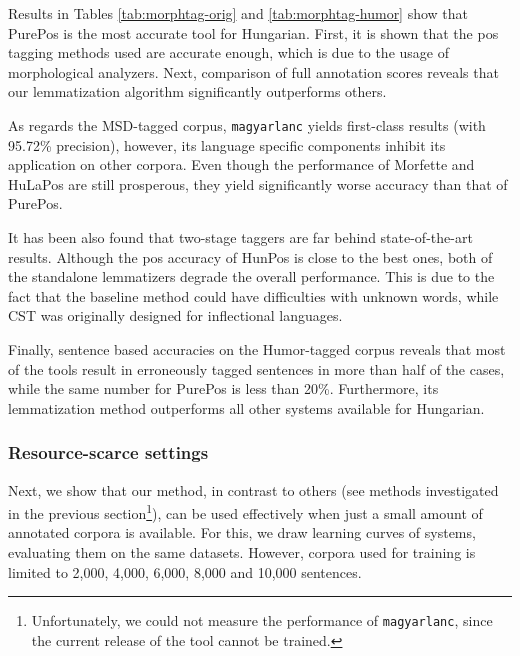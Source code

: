Results in Tables \ref{tab:morphtag-orig} and \ref{tab:morphtag-humor} show that PurePos is the most accurate tool for Hungarian. 
First, it is shown that the \gls{pos} tagging methods used are accurate enough, which is due to the usage of morphological analyzers. 
Next, comparison of full annotation scores reveals that our lemmatization algorithm significantly outperforms others. 

As regards the MSD-tagged corpus, \texttt{magyarlanc} yields first-class results (with 95.72\% precision), however, its language specific components inhibit its application on other corpora. 
Even though the performance of Morfette and HuLaPos are still prosperous, they yield significantly worse accuracy than that of PurePos.  

It has been also found that two-stage taggers are far behind state-of-the-art results. 
Although the \gls{pos} accuracy of HunPos is close to the best ones, both of the standalone lemmatizers degrade the overall performance. 
This is due to the fact that the baseline method could have difficulties with unknown words, while CST was originally designed for inflectional languages. 

Finally, sentence based accuracies on the Humor-tagged corpus reveals that most of the tools result in erroneously tagged sentences in more than half of the cases, while the same number for PurePos is less than 20\%. Furthermore, its lemmatization method outperforms all other systems available for Hungarian.



\subsubsection{Resource-scarce settings}

Next, we show that our method, in contrast to others (see methods investigated in the previous section\footnote{Unfortunately, we could not measure the performance of \texttt{magyarlanc}, since the current release of the tool cannot be trained.}), can be used effectively when just a small amount of annotated corpora is available. 
For this, we draw learning curves of systems, evaluating them on the same datasets. 
However, corpora used for training is limited to 2,000, 4,000, 6,000, 8,000 and 10,000 sentences. 

